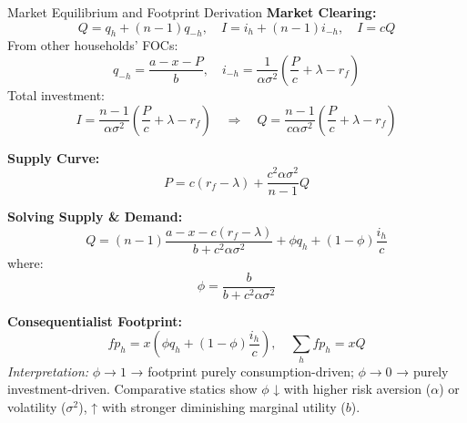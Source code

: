 \documentclass{beamer}
\begin{document}
\begin{frame}{Market Equilibrium and Footprint Derivation}
\footnotesize
\vspace{-2.5em}
\textbf{Market Clearing:}
\[
Q = q_h + (n-1)q_{-h}, \quad I = i_h + (n-1)i_{-h}, \quad I = c Q
\]
From other households’ FOCs:
\[
q_{-h} = \frac{a - x - P}{b}, \quad i_{-h} = \frac{1}{\alpha\sigma^2}\left(\frac{P}{c} + \lambda - r_f\right)
\]
Total investment:  
\[
I = \frac{n-1}{\alpha\sigma^2}\left(\frac{P}{c} + \lambda - r_f\right) \quad \Rightarrow \quad Q = \frac{n-1}{c\alpha\sigma^2}\left(\frac{P}{c} + \lambda - r_f\right)
\]

\vspace{0.3em}
\textbf{Supply Curve:}
\[
P = c(r_f - \lambda) + \frac{c^2\alpha\sigma^2}{n-1} Q
\]

\vspace{0.3em}
\textbf{Solving Supply \& Demand:}
\[
Q = (n-1)\frac{a - x - c(r_f - \lambda)}{b + c^2\alpha\sigma^2} + \phi q_h + (1-\phi)\frac{i_h}{c}
\]
where:
\[
\phi = \frac{b}{b + c^2\alpha\sigma^2}
\]

\vspace{0.3em}
\textbf{Consequentialist Footprint:}
\[
fp_h = x\left(\phi q_h + (1-\phi)\frac{i_h}{c}\right), \quad \sum_h fp_h = x Q
\]
\textit{Interpretation:} \(\phi \to 1\) → footprint purely consumption-driven; \(\phi \to 0\) → purely investment-driven. Comparative statics show \(\phi\) ↓ with higher risk aversion (\(\alpha\)) or volatility (\(\sigma^2\)), ↑ with stronger diminishing marginal utility (\(b\)).
\end{frame}
\end{document}

